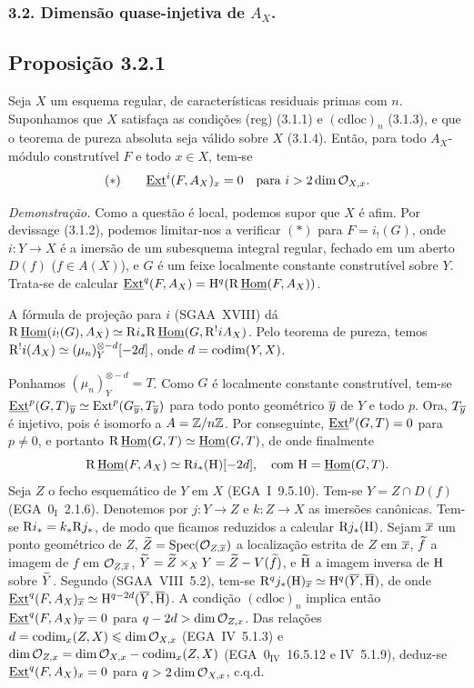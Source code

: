 \subsubsection*{3.2. Dimensão quase-injetiva de $A_X$.}

\subsection*{Proposição 3.2.1}
Seja $X$ um esquema regular, de características residuais primas com $n$. Suponhamos que $X$ satisfaça as condições (reg) (3.1.1) e $(\mathrm{cdloc})_n$ (3.1.3), e que o teorema de pureza absoluta seja válido sobre $X$ (3.1.4). Então, para todo $A_X$-módulo construtível $F$ e todo $x \in X$, tem-se
\[
(*) \qquad \underline{\operatorname{Ext}}^i(F, A_X)_x = 0 \quad \text{para } i > 2\dim \mathcal{O}_{X,x}.
\]

\emph{Demonstração.} Como a questão é local, podemos supor que $X$ é afim. Por devissage (3.1.2), podemos limitar-nos a verificar $(*)$ para $F = i_{!}(G)$, onde $i : Y \to X$ é a imersão de um subesquema integral regular, fechado em um aberto $D(f)$ ($f \in A(X)$), e $G$ é um feixe localmente constante construtível sobre $Y$. Trata-se de calcular $\underline{\operatorname{Ext}}^q(F, A_X) = \mathrm{H}^q(\mathrm{R}\,\underline{\operatorname{Hom}}(F, A_X))$.

A fórmula de projeção para $i$ (SGAA~XVIII) dá $\mathrm{R}\,\underline{\operatorname{Hom}}(i_{!}(G), A_X) \simeq \mathrm{R} i_{*} \mathrm{R}\,\underline{\operatorname{Hom}}(G, \mathrm{R}^{!}iA_X)$. Pelo teorema de pureza, temos $\mathrm{R}^{!}i(A_X) \simeq (\mu_n)^{\otimes -d}_Y[-2d]$, onde $d = \operatorname{codim}(Y,X)$.

Ponhamos $(\mu_n)^{\otimes -d}_Y = T$. Como $G$ é localmente constante construtível, tem-se $\underline{\operatorname{Ext}}^p(G,T)_{\overline{y}} \simeq \operatorname{Ext}^p(G_{\overline{y}}, T_{\overline{y}})$ para todo ponto geométrico $\overline{y}$ de $Y$ e todo $p$. Ora, $T_{\overline{y}}$ é injetivo, pois é isomorfo a $A = \mathbb{Z}/n\mathbb{Z}$. Por conseguinte, $\underline{\operatorname{Ext}}^p(G,T) = 0$ para $p \neq 0$, e portanto $\mathrm{R}\,\underline{\operatorname{Hom}}(G,T) \simeq \underline{\operatorname{Hom}}(G,T)$, de onde finalmente
\[
\mathrm{R}\,\underline{\operatorname{Hom}}(F, A_X) \simeq \mathrm{R} i_{*}(\mathrm{H})[-2d], \quad \text{com } \mathrm{H} = \underline{\operatorname{Hom}}(G,T).
\]
Seja $Z$ o fecho esquemático de $Y$ em $X$ (EGA~I~9.5.10). Tem-se $Y = Z \cap D(f)$ (EGA~$0_{\mathrm{I}}$~2.1.6). Denotemos por $j : Y \to Z$ e $k : Z \to X$ as imersões canônicas. Tem-se $\mathrm{R} i_{*} = k_{*} \mathrm{R} j_{*}$, de modo que ficamos reduzidos a calcular $\mathrm{R} j_{*}(\mathrm{H})$. Sejam $\overline{x}$ um ponto geométrico de $Z$, $\widetilde{Z} = \operatorname{Spec}(\mathcal{O}_{Z,\overline{x}})$ a localização estrita de $Z$ em $\overline{x}$, $\widetilde{f}$ a imagem de $f$ em $\mathcal{O}_{Z,\overline{x}}$, $\widetilde{Y} = \widetilde{Z} \times_X Y = \widetilde{Z} - V(\widetilde{f})$, e $\widetilde{\mathrm{H}}$ a imagem inversa de $\mathrm{H}$ sobre $\widetilde{Y}$. Segundo (SGAA~VIII~5.2), tem-se $\mathrm{R}^q j_{*}(\mathrm{H})_{\overline{x}} \simeq \mathrm{H}^q(\overline{Y}, \overline{\mathrm{H}})$, de onde $\underline{\operatorname{Ext}}^q(F, A_X)_{\overline{x}} \simeq \mathrm{H}^{q-2d}(\overline{Y}, \overline{\mathrm{H}})$. A condição $(\mathrm{cdloc})_n$ implica então $\underline{\operatorname{Ext}}^q(F, A_X)_{\overline{x}} = 0$ para $q - 2d > \dim \mathcal{O}_{Z,x}$. Das relações $d = \operatorname{codim}_{x}(Z,X) \leqslant \dim \mathcal{O}_{X,x}$ (EGA~IV~5.1.3) e $\dim \mathcal{O}_{Z,x} = \dim \mathcal{O}_{X,x} - \operatorname{codim}_{x}(Z,X)$ (EGA~$0_{\mathrm{IV}}$~16.5.12 e IV~5.1.9), deduz-se $\underline{\operatorname{Ext}}^q(F, A_X)_x = 0$ para $q > 2\dim \mathcal{O}_{X,x}$, c.q.d.

